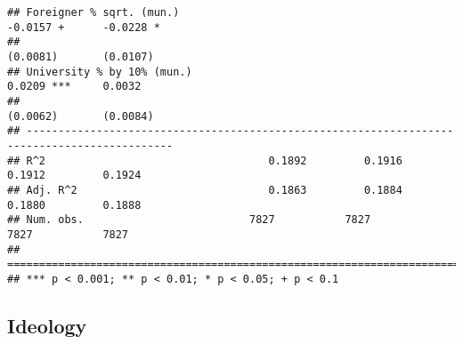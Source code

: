 \documentclass[
]{article}
\begin{document}
\begin{verbatim}
## Foreigner % sqrt. (mun.)                                           -0.0157 +      -0.0228 *  
##                                                                    (0.0081)       (0.0107)   
## University % by 10% (mun.)                                          0.0209 ***     0.0032    
##                                                                    (0.0062)       (0.0084)   
## ---------------------------------------------------------------------------------------------
## R^2                                   0.1892         0.1916         0.1912         0.1924    
## Adj. R^2                              0.1863         0.1884         0.1880         0.1888    
## Num. obs.                          7827           7827           7827           7827         
## =============================================================================================
## *** p < 0.001; ** p < 0.01; * p < 0.05; + p < 0.1
\end{verbatim}

\hypertarget{ideology}{%
\subsection{Ideology}\label{ideology}}
\end{document}
